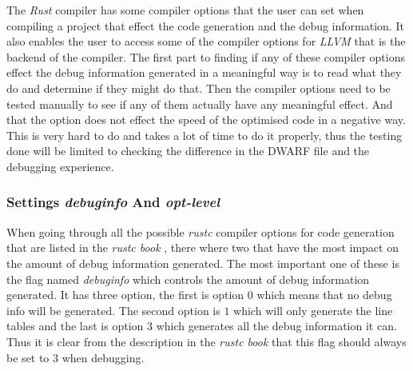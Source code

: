 

The \emph{Rust} compiler has some compiler options that the user can set when compiling a project that effect the code generation and the debug information.
It also enables the user to access some of the compiler options for \emph{LLVM} that is the backend of the compiler.
The first part to finding if any of these compiler options effect the debug information generated in a meaningful way is to read what they do and determine if they might do that.
Then the compiler options need to be tested manually to see if any of them actually have any meaningful effect.
And that the option does not effect the speed of the optimised code in a negative way.
This is very hard to do and takes a lot of time to do it properly, thus the testing done will be limited to checking the difference in the \gls{DWARF} file and the debugging experience.


\subsubsection{Settings \emph{debuginfo} And \emph{opt-level}}
When going through all the possible \emph{rustc} compiler options for code generation that are listed in the \emph{rustc book} \cite{rustc-book-codegen}, there where two that have the most impact on the amount of debug information generated.
The most important one of these is the flag named \emph{debuginfo} which controls the amount of debug information generated.
It has three option, the first is option $0$ which means that no debug info will be generated.
The second option is $1$ which will only generate the line tables and the last is option $3$ which generates all the debug information it can.
Thus it is clear from the description in the \emph{rustc book} that this flag should always be set to $3$ when debugging.


